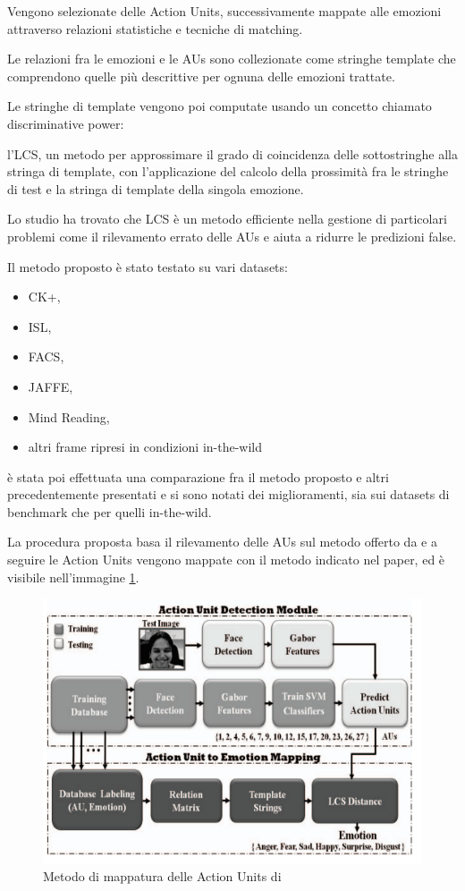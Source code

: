Vengono selezionate delle Action Units, successivamente mappate alle emozioni attraverso relazioni statistiche e tecniche di matching.

Le relazioni fra le emozioni e le AUs sono collezionate come stringhe template che comprendono quelle più descrittive per ognuna delle emozioni trattate.

Le stringhe di template vengono poi computate usando un concetto chiamato discriminative power:

l’LCS, un metodo per approssimare il grado di coincidenza delle sottostringhe alla stringa di template, con l’applicazione del calcolo della prossimità fra le stringhe di test e la stringa di template della singola emozione.

Lo studio ha trovato che LCS è un metodo efficiente nella gestione di particolari problemi come il rilevamento errato delle AUs e aiuta a ridurre le predizioni false.

Il metodo proposto è stato testato su vari datasets:
\begin{itemize}
    \item CK+,
    \item ISL,
    \item FACS,
    \item JAFFE,
    \item Mind Reading,
    \item altri frame ripresi in condizioni in-the-wild
\end{itemize}

è stata poi effettuata una comparazione fra il metodo proposto e altri precedentemente presentati e si sono notati dei miglioramenti, sia sui datasets di benchmark che per quelli in-the-wild.\newpage

La procedura proposta basa il rilevamento delle AUs sul metodo offerto da \cite{RecoFaceExprMachLearnAppSpontBehav} e a seguire le Action Units vengono mappate con il metodo indicato nel paper, ed è visibile nell'immagine \ref{fig:image33}.
\begin{figure}
    \begin{center}    
        \includegraphics[width=0.7\linewidth]{images/18.png}
        \caption{Metodo di mappatura delle Action Units di \cite{RecoFaceExprMachLearnAppSpontBehav}}
        \label{fig:image33}
    \end{center}
\end{figure}


